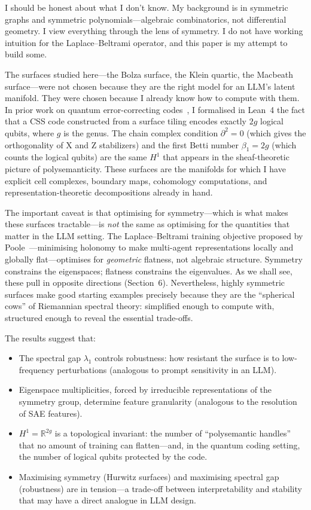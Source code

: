 \documentclass[11pt,a4paper]{article}
\begin{document}
I should be honest about what I don't know. My background is in symmetric graphs
and symmetric polynomials---algebraic combinatorics, not differential geometry.
I view everything through the lens of symmetry. I do not have working
intuition for the Laplace--Beltrami operator, and this paper is my attempt to
build some.

The surfaces studied here---the Bolza surface, the Klein quartic, the Macbeath
surface---were not chosen because they are the right model for an LLM's latent
manifold. They were chosen because I already know how to compute with them.
In prior work on quantum error-correcting codes~\cite{langer2026css}, I
formalised in Lean~4 the fact that a CSS code constructed from a surface tiling
encodes exactly $2g$ logical qubits, where $g$ is the genus. The chain complex
condition $\partial^2 = 0$ (which gives the orthogonality of X and Z
stabilizers) and the first Betti number $\beta_1 = 2g$ (which counts the
logical qubits) are the same $H^1$ that appears in the sheaf-theoretic picture
of polysemanticity. These surfaces are the manifolds for which I have explicit
cell complexes, boundary maps, cohomology computations, and
representation-theoretic decompositions already in hand.

The important caveat is that optimising for symmetry---which is what makes these
surfaces tractable---is \emph{not} the same as optimising for the quantities
that matter in the LLM setting. The Laplace--Beltrami training objective
proposed by Poole~\cite{poole2026}---minimising holonomy to make multi-agent
representations locally and globally flat---optimises for \emph{geometric}
flatness, not algebraic structure. Symmetry constrains the eigenspaces;
flatness constrains the eigenvalues. As we shall see, these pull in opposite
directions (Section~6). Nevertheless, highly symmetric surfaces make good
starting examples precisely because they are the ``spherical cows'' of
Riemannian spectral theory: simplified enough to compute with, structured enough
to reveal the essential trade-offs.

The results suggest that:

\begin{itemize}[leftmargin=*]
  \item The spectral gap $\lambda_1$ controls robustness: how resistant the
    surface is to low-frequency perturbations (analogous to prompt sensitivity
    in an LLM).
  \item Eigenspace multiplicities, forced by irreducible representations of the
    symmetry group, determine feature granularity (analogous to the resolution
    of SAE features).
  \item $H^1 = \mathbb{R}^{2g}$ is a topological invariant: the number of
    ``polysemantic handles'' that no amount of training can flatten---and, in the
    quantum coding setting, the number of logical qubits protected by the code.
  \item Maximising symmetry (Hurwitz surfaces) and maximising spectral gap
    (robustness) are in tension---a trade-off between interpretability and
    stability that may have a direct analogue in LLM design.
\end{itemize}
\end{document}
